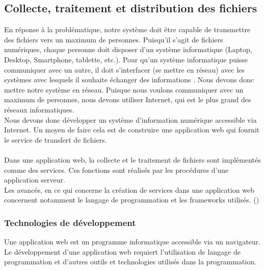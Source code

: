 	\subsection{Collecte, traitement et distribution des fichiers}
	En r\'eponse \`a la probl\'ematique, notre syst\`eme doit \^etre capable de transmettre des fichiers vers un maximum de personnes. Puisqu'il s'agit de fichiers num\'eriques, chaque personne doit disposer d'un syst\`eme informatique (Laptop, Desktop, Smartphone, tablette, etc.). Pour qu'un syst\`eme informatique puisse communiquer avec un autre, il doit s'interfacer (se mettre en r\'eseau) avec les syst\`emes avec lesquels il souhaite \'echanger des informations . Nous devons donc mettre notre syst\`eme en r\'eseau. Puisque nous voulons communiquer avec un maximum de personnes, nous devons utiliser Internet, qui est le plus grand des r\'eseaux informatiques. \\
	Nous devons donc d\'evelopper un syst\`eme d'information num\'erique accessible via Internet. Un moyen de faire cela est de construire une application web\cite{ApplicationWeb} qui fournit le service de transfert de fichiers.\\

\paragraph{} Dans une application web, la collecte et le traitement de fichiers sont impl\'ement\'es comme des services. Ces fonctions sont r\'ealis\'es par les  proc\'edures d'une application serveur.\\
Les avanc\'es, en ce qui concerne la cr\'eation de services dans une application web concernent notamment le langage de programmation et les frameworks utilis\'es. (\cite{techstack})

\subsubsection{Technologies de d\'eveloppement}
Une application web est un programme informatique accessible via un navigateur\cite{ApplicationWeb}. Le d\'eveloppement d'une application web requiert l'utilisation de langage de programmation et d'autres outils et technologies utilis\'es dans la programmation.\\

